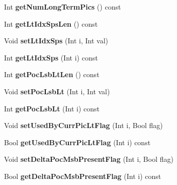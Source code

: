 \begin{DoxyCompactItemize}
Int {\bfseries get\+Num\+Long\+Term\+Pics} () const
\item 
\mbox{\label{class_t_com_slice_acec33859536ef193890570e36bf9057b}} 
Int {\bfseries get\+Lt\+Idx\+Sps\+Len} () const
\item 
\mbox{\label{class_t_com_slice_a2b1cc7eab1f7079d693713b3f2f16ddf}} 
Void {\bfseries set\+Lt\+Idx\+Sps} (Int i, Int val)
\item 
\mbox{\label{class_t_com_slice_acaea877ad33ca886833e294277ea705f}} 
Int {\bfseries get\+Lt\+Idx\+Sps} (Int i) const
\item 
\mbox{\label{class_t_com_slice_aea130f23e0b80063f4196fd95efecddd}} 
Int {\bfseries get\+Poc\+Lsb\+Lt\+Len} () const
\item 
\mbox{\label{class_t_com_slice_a487f9b9634cf647da70e2f7bd8e28922}} 
Void {\bfseries set\+Poc\+Lsb\+Lt} (Int i, Int val)
\item 
\mbox{\label{class_t_com_slice_a50dd460bb34dce78b8b206b4e3da12bf}} 
Int {\bfseries get\+Poc\+Lsb\+Lt} (Int i) const
\item 
\mbox{\label{class_t_com_slice_aca6c6ff0fccbbad134ba227ee5862b83}} 
Void {\bfseries set\+Used\+By\+Curr\+Pic\+Lt\+Flag} (Int i, Bool flag)
\item 
\mbox{\label{class_t_com_slice_a4dd5411ef28c3f49fa0101fb1b68401a}} 
Bool {\bfseries get\+Used\+By\+Curr\+Pic\+Lt\+Flag} (Int i) const
\item 
\mbox{\label{class_t_com_slice_ac3cd352773c0ef64f55115b181be6aba}} 
Void {\bfseries set\+Delta\+Poc\+Msb\+Present\+Flag} (Int i, Bool flag)
\item 
\mbox{\label{class_t_com_slice_aa1b79e78562e8fb47d47085fb44f538a}} 
Bool {\bfseries get\+Delta\+Poc\+Msb\+Present\+Flag} (Int i) const
\item 
\mbox{\label{class_t_com_slice_ad0878617765e4f431293368839120689}} 

\end{DoxyCompactItemize}

